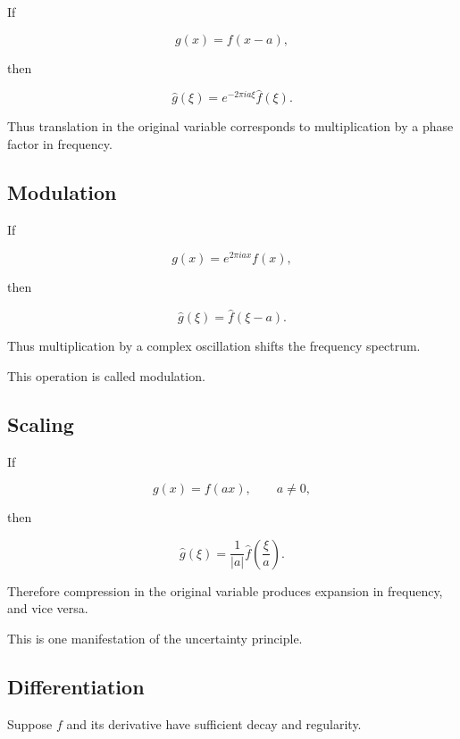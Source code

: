 If

\[
g(x)=f(x-a),
\]

then

\[
\boxed{
\widehat{g}(\xi)
=
e^{-2\pi i a\xi}
\widehat{f}(\xi).
}
\]

Thus translation in the original variable corresponds to multiplication
by a phase factor in frequency.

\subsection{Modulation}
\label{subsec:fourier-modulation}

If

\[
g(x)
=
e^{2\pi i ax}f(x),
\]

then

\[
\boxed{
\widehat{g}(\xi)
=
\widehat{f}(\xi-a).
}
\]

Thus multiplication by a complex oscillation shifts the frequency
spectrum.

This operation is called modulation.

\subsection{Scaling}
\label{subsec:fourier-scaling}

If

\[
g(x)=f(ax),
\qquad
a\neq0,
\]

then

\[
\boxed{
\widehat{g}(\xi)
=
\frac{1}{|a|}
\widehat{f}\left(\frac{\xi}{a}\right).
}
\]

Therefore compression in the original variable produces expansion in
frequency, and vice versa.

This is one manifestation of the uncertainty principle.

\subsection{Differentiation}
\label{subsec:fourier-differentiation}

Suppose \(f\) and its derivative have sufficient decay and regularity.

